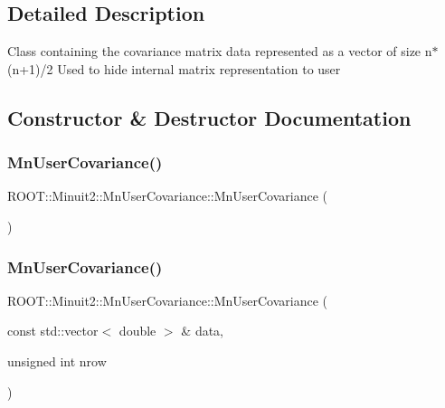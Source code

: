 \subsection{Detailed Description}
Class containing the covariance matrix data represented as a vector of size n$\ast$(n+1)/2 Used to hide internal matrix representation to user 

\subsection{Constructor \& Destructor Documentation}
\mbox{\label{classROOT_1_1Minuit2_1_1MnUserCovariance_a40b83657c20ed7612fd58971145e2150}} 
\subsubsection{\texorpdfstring{MnUserCovariance()}{MnUserCovariance()}\hspace{0.1cm}{\footnotesize\ttfamily [1/8]}}
{\footnotesize\ttfamily R\+O\+O\+T\+::\+Minuit2\+::\+Mn\+User\+Covariance\+::\+Mn\+User\+Covariance (\begin{DoxyParamCaption}{ }\end{DoxyParamCaption})\hspace{0.3cm}{\ttfamily [inline]}}

\mbox{\label{classROOT_1_1Minuit2_1_1MnUserCovariance_aeb4bbc60170bc2b4694b9064b4f6761c}} 
\subsubsection{\texorpdfstring{MnUserCovariance()}{MnUserCovariance()}\hspace{0.1cm}{\footnotesize\ttfamily [2/8]}}
{\footnotesize\ttfamily R\+O\+O\+T\+::\+Minuit2\+::\+Mn\+User\+Covariance\+::\+Mn\+User\+Covariance (\begin{DoxyParamCaption}\item[{const std\+::vector$<$ double $>$ \&}]{data,  }\item[{unsigned int}]{nrow }\end{DoxyParamCaption})\hspace{0.3cm}{\ttfamily [inline]}}

